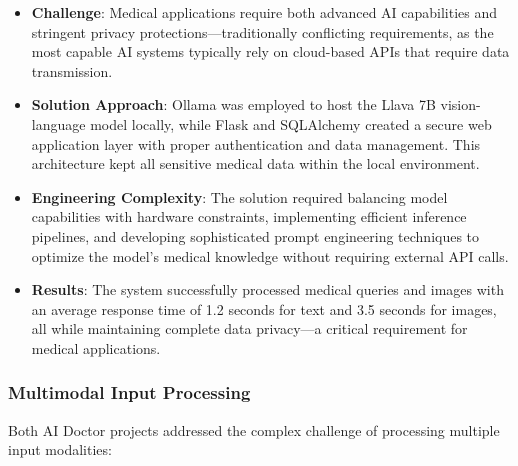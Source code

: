 \documentclass[12pt,a4paper]{article}
\begin{document}
\begin{itemize}
    \item \textbf{Challenge}: Medical applications require both advanced AI capabilities and stringent privacy protections—traditionally conflicting requirements, as the most capable AI systems typically rely on cloud-based APIs that require data transmission.
    
    \item \textbf{Solution Approach}: Ollama was employed to host the Llava 7B vision-language model locally, while Flask and SQLAlchemy created a secure web application layer with proper authentication and data management. This architecture kept all sensitive medical data within the local environment.
    
    \item \textbf{Engineering Complexity}: The solution required balancing model capabilities with hardware constraints, implementing efficient inference pipelines, and developing sophisticated prompt engineering techniques to optimize the model's medical knowledge without requiring external API calls.
    
    \item \textbf{Results}: The system successfully processed medical queries and images with an average response time of 1.2 seconds for text and 3.5 seconds for images, all while maintaining complete data privacy—a critical requirement for medical applications.
\end{itemize}

\subsubsection{Multimodal Input Processing}
Both AI Doctor projects addressed the complex challenge of processing multiple input modalities:
\end{document}
